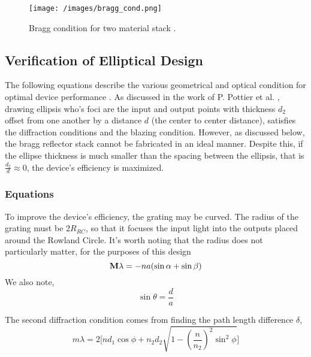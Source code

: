 \documentclass{article}
\begin{document}
\begin{figure}[H]
\centering
\texttt{[image: /images/bragg\_cond.png]}
\caption{ Bragg condition for two material stack \cite{Packirisamy2012Mono-OrderGrating}.}
\label{fig:nanos_test_code0}
\end{figure}

\subsection{Verification of Elliptical Design}
The following equations describe the various geometrical and optical condition for optimal device performance \cite{Packirisamy2012Mono-OrderGrating,Pottier2014IntegratedInsulator}. As discussed in the work of P. Pottier et al. \cite{Packirisamy2012Mono-OrderGrating}, drawing ellipsis who's foci are the input and output points with thickness \(d_2\) offset from one another by a distance $d$ (the center to center distance), satisfies the diffraction conditions and the blazing condition. However, as discussed below, the bragg reflector stack cannot be fabricated in an ideal manner. Despite this, if the ellipse thickness is much smaller than the spacing between the ellipsis, that is $\frac{d_2}{d} \approx 0$, the device's efficiency is maximized.

\subsubsection{Equations}

To improve the device's efficiency, the grating may be curved. The radius of the grating must be $2 R_{RC}$, so that it focuses the input light into the outputs placed around the Rowland Circle. It's worth noting that the radius does not particularly matter, for the purposes of this design
\begin{equation}
    \vb{M \lambda} = - n a (\sin{\alpha} + \sin{\beta})
    \label{eq:a}
\end{equation}
                We also note, 
\begin{equation*}
    \sin{\theta} = \frac{d}{a}
\end{equation*}
                
The second diffraction condition comes from finding the path length difference $\delta$,
\begin{equation*}
    m \lambda = 2 \Bigg[ n d_1 \cos{\phi} + n_2 d_2 \sqrt{1-(\frac{n}{n_2})^2 \sin^2 \phi} \Bigg]
\end{equation*}
\end{document}

